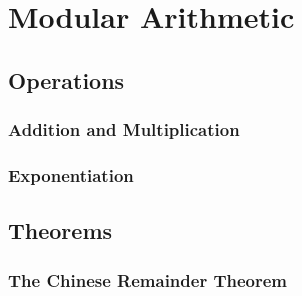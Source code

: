 \section{Modular Arithmetic}

\subsection{Operations}

\subsubsection{Addition and Multiplication}

\subsubsection{Exponentiation}


\subsection{Theorems}


\subsubsection{The Chinese Remainder Theorem}



\begin{comment}
-Modular addition and multiplication
-Modular exponentiation, logarithms and roots
-Chinese Remainder Theorem
\end{comment}